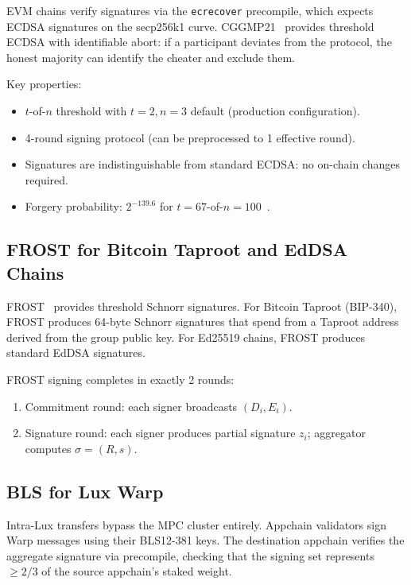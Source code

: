 EVM chains verify signatures via the \texttt{ecrecover} precompile, which expects ECDSA signatures on the secp256k1 curve. CGGMP21~\cite{cggmp21} provides threshold ECDSA with identifiable abort: if a participant deviates from the protocol, the honest majority can identify the cheater and exclude them.

Key properties:
\begin{itemize}[nosep]
  \item $t$-of-$n$ threshold with $t = 2, n = 3$ default (production configuration).
  \item 4-round signing protocol (can be preprocessed to 1 effective round).
  \item Signatures are indistinguishable from standard ECDSA: no on-chain changes required.
  \item Forgery probability: $2^{-139.6}$ for $t = 67$-of-$n = 100$~\cite{luxbridge2023}.
\end{itemize}

\subsection{FROST for Bitcoin Taproot and EdDSA Chains}

FROST~\cite{frost} provides threshold Schnorr signatures. For Bitcoin Taproot (BIP-340), FROST produces 64-byte Schnorr signatures that spend from a Taproot address derived from the group public key. For Ed25519 chains, FROST produces standard EdDSA signatures.

\begin{property}
FROST signing completes in exactly 2 rounds:
\begin{enumerate}[nosep]
  \item Commitment round: each signer broadcasts $(D_i, E_i)$.
  \item Signature round: each signer produces partial signature $z_i$; aggregator computes $\sigma = (R, s)$.
\end{enumerate}
\end{property}

\subsection{BLS for Lux Warp}

Intra-Lux transfers bypass the MPC cluster entirely. Appchain validators sign Warp messages using their BLS12-381 keys. The destination appchain verifies the aggregate signature via precompile, checking that the signing set represents $\geq 2/3$ of the source appchain's staked weight.

